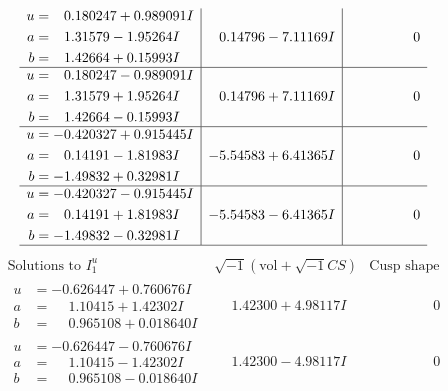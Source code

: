 \documentclass[1p]{elsarticle_modified}
\theoremstyle{definition}
\newcommand{\I}{\sqrt{-1}}
\begin{document}
$$\begin{array}{c|c|c}
\begin{aligned}
u &= \phantom{-}0.180247 + 0.989091 I \\
a &= \phantom{-}1.31579 - 1.95264 I \\
b &= \phantom{-}1.42664 + 0.15993 I\end{aligned}
 & \phantom{-}0.14796 - 7.11169 I & \phantom{-0.000000 } 0 \\ \hline\begin{aligned}
u &= \phantom{-}0.180247 - 0.989091 I \\
a &= \phantom{-}1.31579 + 1.95264 I \\
b &= \phantom{-}1.42664 - 0.15993 I\end{aligned}
 & \phantom{-}0.14796 + 7.11169 I & \phantom{-0.000000 } 0 \\ \hline\begin{aligned}
u &= -0.420327 + 0.915445 I \\
a &= \phantom{-}0.14191 - 1.81983 I \\
b &= -1.49832 + 0.32981 I\end{aligned}
 & -5.54583 + 6.41365 I & \phantom{-0.000000 } 0 \\ \hline\begin{aligned}
u &= -0.420327 - 0.915445 I \\
a &= \phantom{-}0.14191 + 1.81983 I \\
b &= -1.49832 - 0.32981 I\end{aligned}
 & -5.54583 - 6.41365 I & \phantom{-0.000000 } 0\\
 \hline 
 \end{array}$$\newpage$$\begin{array}{c|c|c}  
\text{Solutions to }I^u_{1}& \I (\text{vol} + \sqrt{-1}CS) & \text{Cusp shape}\\
 \hline 
\begin{aligned}
u &= -0.626447 + 0.760676 I \\
a &= \phantom{-}1.10415 + 1.42302 I \\
b &= \phantom{-}0.965108 + 0.018640 I\end{aligned}
 & \phantom{-}1.42300 + 4.98117 I & \phantom{-0.000000 } 0 \\ \hline\begin{aligned}
u &= -0.626447 - 0.760676 I \\
a &= \phantom{-}1.10415 - 1.42302 I \\
b &= \phantom{-}0.965108 - 0.018640 I\end{aligned}
 & \phantom{-}1.42300 - 4.98117 I & \phantom{-0.000000 } 0 \\ \hline\begin{aligned}

\end{aligned}
\end{array}$$
\end{document}
